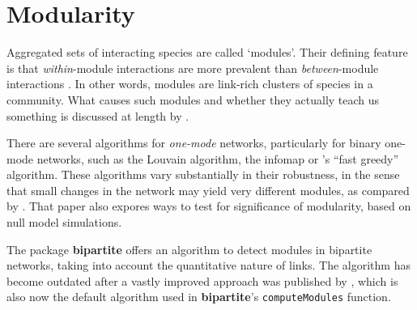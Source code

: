 \documentclass[a4paper, 11pt]{article}\usepackage[]{graphicx}\usepackage[]{color}
\newcommand{\package}[1]{\textbf{#1}}
\newcommand{\code}[1]{\texttt{#1}}
\begin{document}
\section{Modularity}
Aggregated sets of interacting species are called `modules'. Their defining feature is that \emph{within}-module interactions are more prevalent than \emph{between}-module interactions \citep{Newman2003, Newman2004, Fortunato2010}. In other words, modules are link-rich clusters of species in a community. What causes such modules and whether they actually teach us something is discussed at length by \citet{Dormann2017AREES}. 

There are several algorithms for \emph{one-mode} networks, particularly for binary one-mode networks, such as the Louvain algorithm, the infomap or \citet{Clauset2004}'s ``fast greedy'' algorithm. These algorithms vary substantially in their robustness, in the sense that small changes in the network may yield very different modules, as compared by \citet{Policastro2021}. That paper also expores ways to test for significance of modularity, based on null model simulations.

The package \package{bipartite} offers an algorithm \citep[QuaBiMo, described in technical detail in][]{Dormann2014} to detect modules in bipartite networks, taking into account the quantitative nature of links. The algorithm has become outdated after a vastly improved approach was published by \citet{Beckett2016}, which is also now the default algorithm used in \package{bipartite}'s \code{computeModules} function.
\end{document}
